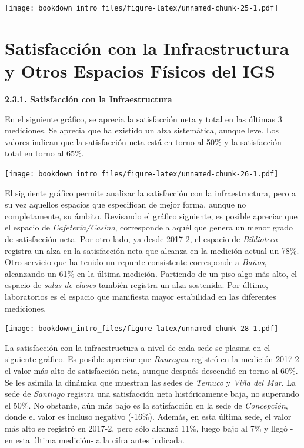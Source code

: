 \documentclass[]{book}
\begin{document}
\texttt{[image: bookdown\_intro\_files/figure-latex/unnamed-chunk-25-1.pdf]}

\section{Satisfacción con la Infraestructura y Otros Espacios Físicos
del
IGS}\label{satisfaccion-con-la-infraestructura-y-otros-espacios-fisicos-del-igs}

\textbf{2.3.1. Satisfacción con la Infraestructura}

En el siguiente gráfico, se aprecia la satisfacción neta y total en las
últimas 3 mediciones. Se aprecia que ha existido un alza sistemática,
aunque leve. Los valores indican que la satisfacción neta está en torno
al 50\% y la satisfacción total en torno al 65\%.

\texttt{[image: bookdown\_intro\_files/figure-latex/unnamed-chunk-26-1.pdf]}

El siguiente gráfico permite analizar la satisfacción con la
infraestructura, pero a su vez aquellos espacios que especifican de
mejor forma, aunque no completamente, su ámbito. Revisando el gráfico
siguiente, es posible apreciar que el espacio de
\emph{Cafetería/Casino}, corresponde a aquél que genera un menor grado
de satisfacción neta. Por otro lado, ya desde 2017-2, el espacio de
\emph{Biblioteca} registra un alza en la satisfacción neta que alcanza
en la medición actual un 78\%. Otro servicio que ha tenido un repunte
consistente corresponde a \emph{Baños}, alcanzando un 61\% en la última
medición. Partiendo de un piso algo más alto, el espacio de \emph{salas
de clases} también registra un alza sostenida. Por último, laboratorios
es el espacio que manifiesta mayor estabilidad en las diferentes
mediciones.

\texttt{[image: bookdown\_intro\_files/figure-latex/unnamed-chunk-28-1.pdf]}

La satisfacción con la infraestructura a nivel de cada sede se plasma en
el siguiente gráfico. Es posible apreciar que \emph{Rancagua} registró
en la medición 2017-2 el valor más alto de satisfacción neta, aunque
después descendió en torno al 60\%. Se les asimila la dinámica que
muestran las sedes de \emph{Temuco} y \emph{Viña del Mar}. La sede de
\emph{Santiago} registra una satisfacción neta históricamente baja, no
superando el 50\%. No obstante, aún más bajo es la satisfacción en la
sede de \emph{Concepción}, donde el valor es incluso negativo (-16\%).
Además, en esta última sede, el valor más alto se registró en 2017-2,
pero sólo alcanzó 11\%, luego bajo al 7\% y llegó -en esta última
medición- a la cifra antes indicada.
\end{document}
